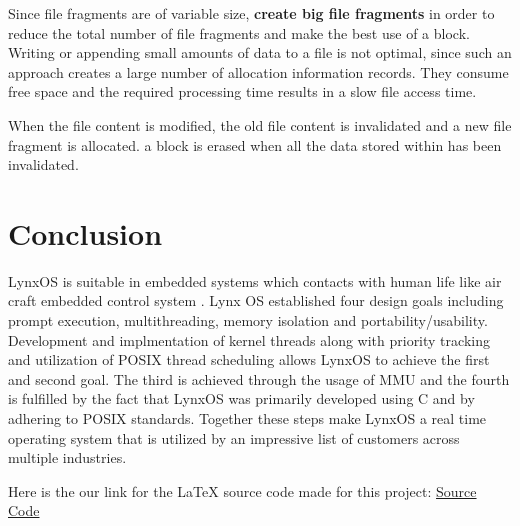 \documentclass[12pt]{article}
\begin{document}
Since file fragments are of variable size, \textbf{create big file fragments} in order to reduce the total number of file fragments and make the best use of a block. Writing or appending small amounts of data to a file is not optimal, since such an approach creates a large number of allocation information records. They consume free space and the required processing time results in a slow file access time.

When the file content is modified, the old file content is invalidated and a new file fragment is allocated. a block is erased when all the data stored within has been invalidated.

\cleardoublepage

\section{Conclusion}
LynxOS is suitable in embedded systems which contacts with human life like air craft embedded control system .
Lynx OS established four design goals including prompt execution, multithreading,
memory isolation and portability/usability. Development and implmentation of kernel
threads along with priority tracking and utilization of POSIX thread scheduling allows
LynxOS to achieve the first and second goal. The third is achieved through the usage of
MMU and the fourth is fulfilled by the fact that LynxOS was primarily developed using 
C and by adhering to POSIX standards. Together these steps make LynxOS a real time
operating system that is utilized by an impressive list of customers across multiple
industries. 

Here is the our link for the LaTeX source code made for this project: \href{https://github.com/Daksh-404/operating-system-lab/tree/main/mainOSTex}{Source Code}

\cleardoublepage



\end{document}
